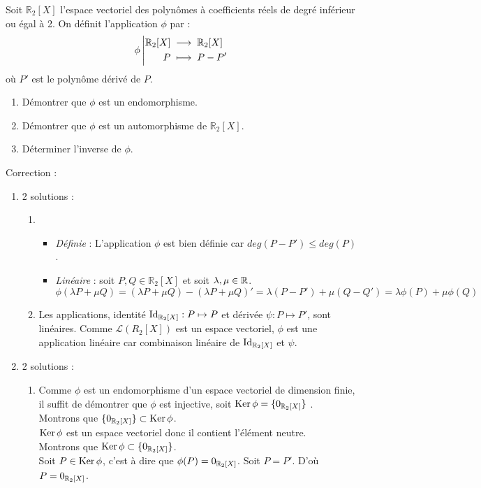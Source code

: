 \documentclass{book}
\begin{document}
Soit $\mathbb R_2[X]$ l'espace vectoriel des polynômes à coefficients réels de degré inférieur ou égal à 2.
On définit l'application $\phi$ par : 
$$
{\phi}\left|\begin{aligned}{\mathbb{R}_2[X]}&\;\longrightarrow\;{\mathbb{R} _2[X]}\\{P}&\;\longmapsto\;{P-P'}\end{aligned}\right.
$$ où $P'$ est le polynôme dérivé de $P$.
\begin{enumerate}
\item Démontrer que $\phi$ est un endomorphisme. 
\item  Démontrer que $\phi$ est un automorphisme de $\mathbb R_2[X]$.
\item Déterminer l'inverse de $\phi$.
\end{enumerate}
Correction :
\begin{enumerate}
\item 2 solutions :
\begin{enumerate}
\item 
\begin{itemize}
\item \textit{Définie} : L'application $\phi$ est bien définie car $deg(P-P')\leq deg(P)$.
\item \textit{Linéaire} : soit $P,Q\in \mathbb R_2[X]$ et soit $\lambda,\mu \in \mathbb{R} $.\\
$$\phi(\lambda P + \mu Q)= (\lambda P + \mu Q)-(\lambda P + \mu Q)'=\lambda (P - P')+\mu(Q - Q')= \lambda\phi( P) + \mu \phi(Q) $$
\end{itemize} 
\item Les applications, identité $\mathrm{Id}_{\mathbb{R} _2[X]}:P\mapsto P$ et dérivée $\psi:P\mapsto P'$, sont linéaires. Comme $\mathcal{L}(R_2[X])$ est un espace vectoriel, $\phi$ est une application linéaire car combinaison linéaire de $\mathrm{Id}_{\mathbb{R} _2[X]}$ et $\psi$. 
\end{enumerate}
\item 2 solutions :
\begin{enumerate}
\item Comme $\phi$ est un endomorphisme d'un espace vectoriel de dimension finie, il suffit de démontrer que  $\phi$ est injective, soit  $\operatorname{Ker}\phi=\{0_{\mathbb{R} _2[X]} \}$ .\\
Montrons que  $\{0_{\mathbb{R} _2[X]} \} \subset \operatorname{Ker}\phi $.\\
\hspace{1cm}$\operatorname{Ker}\phi$ est un espace vectoriel donc il contient l'élément neutre.\\
Montrons que $\operatorname{Ker}\phi   \subset \{0_{\mathbb{R} _2[X]} \}$.\\
\hspace{1cm}Soit $P\in \operatorname{Ker}\phi$, c'est à dire que $\phi(P)=0_{\mathbb{R} _2[X]}$. Soit $P=P'$. D'où $P=0_{\mathbb{R} _2[X]}$.

\end{enumerate}
\end{enumerate}
\end{document}
